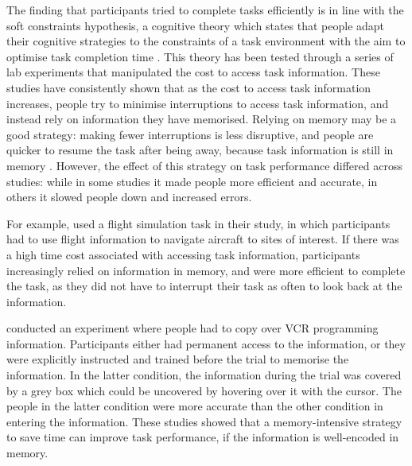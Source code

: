 The finding that participants tried to complete tasks efficiently is in line with the soft constraints hypothesis, a cognitive theory which states that people adapt their cognitive strategies to the constraints of a task environment with the aim to optimise task completion time \citep{Gray2006}. This theory has been tested through a series of lab experiments that manipulated the cost to access task information. These studies have consistently shown that as the cost to access task information increases, people try to minimise interruptions to access task information, and instead rely on information they have memorised. Relying on memory may be a good strategy: making fewer interruptions is less disruptive, and people are quicker to resume the task after being away, because task information is still in memory \citep{Morgan2009}. However, the effect of this strategy on task performance differed across studies: while in some studies it made people more efficient and accurate, in others it slowed people down and increased errors. 

For example, \citet{Waldron2007} used a flight simulation task in their study, in which participants had to use flight information to navigate aircraft to sites of interest. If there was a high time cost associated with accessing task information, participants increasingly relied on information in memory, and were more efficient to complete the task, as they did not have to interrupt their task as often to look back at the information. 

\newpage

\citet{Gray2004} conducted an experiment where people had to copy over VCR programming information. Participants either had permanent access to the information, or they were explicitly instructed and trained before the trial to memorise the information. In the latter condition, the information during the trial was covered by a grey box which could be uncovered by hovering over it with the cursor. The people in the latter condition were more accurate than the other condition in entering the information. These studies showed that a memory-intensive strategy to save time can improve task performance, if the information is well-encoded in memory.

